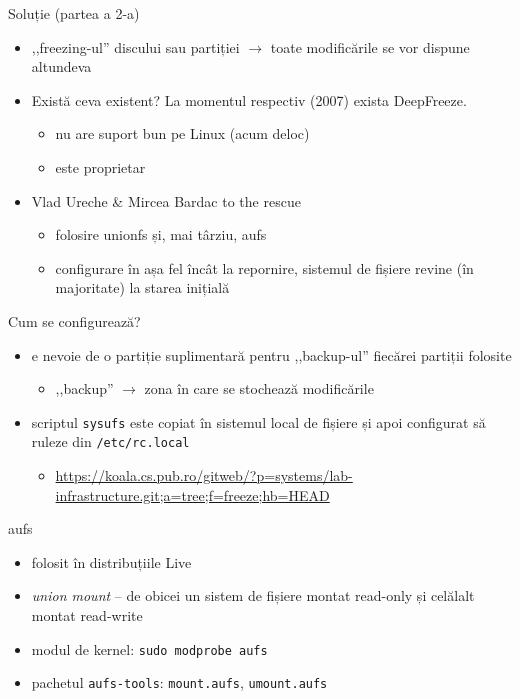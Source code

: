 \documentclass{simple}
\begin{document}
\begin{frame}{Soluție (partea a 2-a)}
  \begin{itemize}
    \item ,,freezing-ul'' discului sau partiției $\rightarrow$ toate
      modificările se vor dispune altundeva
    \item Există ceva existent? La momentul respectiv (2007) exista
      DeepFreeze.
      \begin{itemize}
        \item nu are suport bun pe Linux (acum deloc)
        \item este proprietar
      \end{itemize}
    \item Vlad Ureche \& Mircea Bardac to the rescue
      \begin{itemize}
        \item folosire unionfs și, mai târziu, aufs
        \item configurare în așa fel încât la repornire, sistemul de fișiere
          revine (în majoritate) la starea inițială
      \end{itemize}
  \end{itemize}
\end{frame}

\begin{frame}{Cum se configurează?}
  \begin{itemize}
    \item e nevoie de o partiție suplimentară pentru ,,backup-ul'' fiecărei
      partiții folosite
      \begin{itemize}
        \item ,,backup'' $\rightarrow$ zona în care se stochează modificările
      \end{itemize}
    \item scriptul \texttt{sysufs} este copiat în sistemul local de fișiere și
      apoi configurat să ruleze din \texttt{/etc/rc.local}
      \begin{itemize}
        \item \url{https://koala.cs.pub.ro/gitweb/?p=systems/lab-infrastructure.git;a=tree;f=freeze;hb=HEAD}
      \end{itemize}
  \end{itemize}
\end{frame}

\begin{frame}{aufs}
  \begin{itemize}
    \item folosit în distribuțiile Live
    \item \textit{union mount} -- de obicei un sistem de fișiere montat
      read-only și celălalt montat read-write
    \item modul de kernel: \texttt{sudo modprobe aufs}
    \item pachetul \texttt{aufs-tools}: \texttt{mount.aufs},
      \texttt{umount.aufs}
  \end{itemize}
\end{frame}
\end{document}
